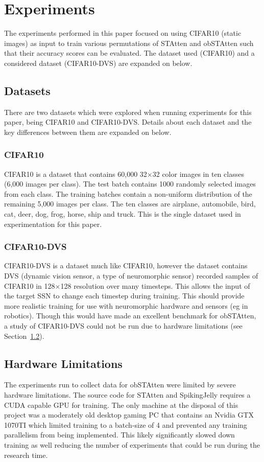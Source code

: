 \documentclass[../main.tex]{subfiles}
\begin{document}
\section{Experiments}
\label{sec:exp}
The experiments performed in this paper focused on using CIFAR10 (static images) as input to train various permutations of STAtten and obSTAtten such that their accuracy scores can be evaluated. The dataset used (CIFAR10) and a considered dataset (CIFAR10-DVS) are expanded on below. 

\subsection{Datasets}
There are two datasets which were explored when running experiments for this paper, being CIFAR10 and CIFAR10-DVS. Details about each dataset and the key differences between them are expanded on below. 

\subsubsection{CIFAR10}
CIFAR10 is a dataset that contains 60,000 32$\times$32 color images in ten classes (6,000 images per class). The test batch contains 1000 randomly selected images from each class. The training batches contain a non-uniform distribution of the remaining 5,000 images per class. The ten classes are airplane, automobile, bird, cat, deer, dog, frog, horse, ship and truck\cite{cifar10}. This is the single dataset used in experimentation for this paper.

\subsubsection{CIFAR10-DVS}
CIFAR10-DVS is a dataset much like CIFAR10, however the dataset contains DVS (dynamic vision sensor, a type of neuromorphic sensor) recorded samples of CIFAR10 in 128$\times$128 resolution over many timesteps. This allows the input of the target SSN to change each timestep during training\cite{cifar10-dvs}. This should provide more realistic training for use with neuromorphic hardware and sensors (eg in robotics)\cite{training}. Though this would have made an excellent benchmark for obSTAtten, a study of CIFAR10-DVS could not be run due to hardware limitations (see Section~\ref{sec:hwl}).

\subsection{Hardware Limitations}
\label{sec:hwl}
The experiments run to collect data for obSTAtten were limited by severe hardware limitations. The source code for STAtten and SpikingJelly requires a CUDA\cite{spikingjelly} capable GPU for training. The only machine at the disposal of this project was a moderately old desktop gaming PC that contains an Nvidia GTX 1070TI which limited training to a batch-size of 4 and prevented any training parallelism from being implemented. This likely significantly slowed down training as well reducing the number of experiments that could be run during the research time.
\end{document}
